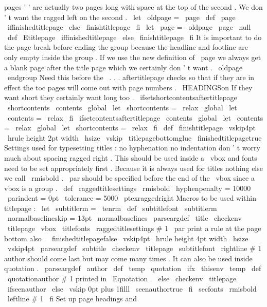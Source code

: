 {{{{pages
'
'
are
actually
two
pages
long
with
space
%
at
the
top
of
the
second
.
We
don
'
t
want
the
ragged
left
on
the
second
.
\
let
\
oldpage
=
\
page
\
def
\
page
{
%
\
iffinishedtitlepage
\
else
\
finishtitlepage
\
fi
\
let
\
page
=
\
oldpage
\
page
\
null
}
%
}
\
def
\
Etitlepage
{
%
\
iffinishedtitlepage
\
else
\
finishtitlepage
\
fi
%
It
is
important
to
do
the
page
break
before
ending
the
group
%
because
the
headline
and
footline
are
only
empty
inside
the
group
.
%
If
we
use
the
new
definition
of
\
page
we
always
get
a
blank
page
%
after
the
title
page
which
we
certainly
don
'
t
want
.
\
oldpage
\
endgroup
%
%
Need
this
before
the
\
.
.
.
aftertitlepage
checks
so
that
if
they
are
%
in
effect
the
toc
pages
will
come
out
with
page
numbers
.
\
HEADINGSon
%
%
If
they
want
short
they
certainly
want
long
too
.
\
ifsetshortcontentsaftertitlepage
\
shortcontents
\
contents
\
global
\
let
\
shortcontents
=
\
relax
\
global
\
let
\
contents
=
\
relax
\
fi
%
\
ifsetcontentsaftertitlepage
\
contents
\
global
\
let
\
contents
=
\
relax
\
global
\
let
\
shortcontents
=
\
relax
\
fi
}
\
def
\
finishtitlepage
{
%
\
vskip4pt
\
hrule
height
2pt
width
\
hsize
\
vskip
\
titlepagebottomglue
\
finishedtitlepagetrue
}
%
Settings
used
for
typesetting
titles
:
no
hyphenation
no
indentation
%
don
'
t
worry
much
about
spacing
ragged
right
.
This
should
be
used
%
inside
a
\
vbox
and
fonts
need
to
be
set
appropriately
first
.
Because
%
it
is
always
used
for
titles
nothing
else
we
call
\
rmisbold
.
\
par
%
should
be
specified
before
the
end
of
the
\
vbox
since
a
vbox
is
a
group
.
%
\
def
\
raggedtitlesettings
{
%
\
rmisbold
\
hyphenpenalty
=
10000
\
parindent
=
0pt
\
tolerance
=
5000
\
ptexraggedright
}
%
Macros
to
be
used
within
titlepage
:
\
let
\
subtitlerm
=
\
tenrm
\
def
\
subtitlefont
{
\
subtitlerm
\
normalbaselineskip
=
13pt
\
normalbaselines
}
\
parseargdef
\
title
{
%
\
checkenv
\
titlepage
\
vbox
{
\
titlefonts
\
raggedtitlesettings
#
1
\
par
}
%
%
print
a
rule
at
the
page
bottom
also
.
\
finishedtitlepagefalse
\
vskip4pt
\
hrule
height
4pt
width
\
hsize
\
vskip4pt
}
\
parseargdef
\
subtitle
{
%
\
checkenv
\
titlepage
{
\
subtitlefont
\
rightline
{
#
1
}
}
%
}
%
author
should
come
last
but
may
come
many
times
.
%
It
can
also
be
used
inside
quotation
.
%
\
parseargdef
\
author
{
%
\
def
\
temp
{
\
quotation
}
%
\
ifx
\
thisenv
\
temp
\
def
\
quotationauthor
{
#
1
}
%
printed
in
\
Equotation
.
\
else
\
checkenv
\
titlepage
\
ifseenauthor
\
else
\
vskip
0pt
plus
1filll
\
seenauthortrue
\
fi
{
\
secfonts
\
rmisbold
\
leftline
{
#
1
}
}
%
\
fi
}
%
Set
up
page
headings
and
}}}
